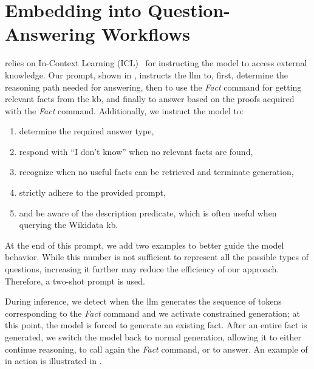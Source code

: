 \section[Embedding \refactx into Question-Answering Workflows][\refactx for QA]{Embedding  into Question-Answering Workflows}
\label{sec:refactx-qa}

 relies on In-Context Learning (ICL)~\cite{dong2024survey} for instructing the model to access external knowledge.
Our prompt, shown in , instructs the \ac{llm} to, first, determine the reasoning path needed for answering, then to use the \emph{Fact} command for getting relevant facts from the \ac{kb}, and finally to answer based on the proofs acquired with the \emph{Fact} command. Additionally, we instruct the model to:
\begin{enumerate}
\item determine the required answer type,
\item respond with ``I don't know'' when no relevant facts are found,
\item recognize when no useful facts can be retrieved and terminate generation,
\item strictly adhere to the provided prompt,
\item and be aware of the description predicate, which is often useful when querying the Wikidata \ac{kb}.
\end{enumerate}

At the end of this prompt, we add two examples to better guide the model behavior. While this number is not sufficient to represent all the possible types of questions, increasing it further may reduce the efficiency of our approach. Therefore, a two-shot prompt is used.

During inference, we detect when the \ac{llm} generates the sequence of tokens corresponding to the \emph{Fact} command and we activate constrained generation; at this point, the model is forced to generate an existing fact. After an entire fact is generated, we switch the model back to normal generation, allowing it to either continue reasoning, to call again the \emph{Fact} command, or to answer. An example of  in action is illustrated in .

